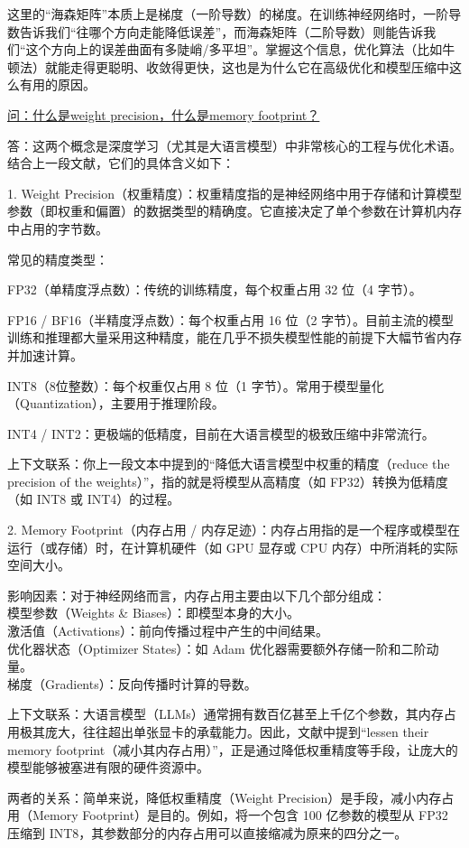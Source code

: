 \documentclass{article}
\begin{document}
{\color{blue}
这里的“海森矩阵”本质上是梯度（一阶导数）的梯度。在训练神经网络时，一阶导数告诉我们“往哪个方向走能降低误差”，而海森矩阵（二阶导数）则能告诉我们“这个方向上的误差曲面有多陡峭/多平坦”。掌握这个信息，优化算法（比如牛顿法）就能走得更聪明、收敛得更快，这也是为什么它在高级优化和模型压缩中这么有用的原因。

\underline{问：什么是weight precision，什么是memory footprint？}

答：这两个概念是深度学习（尤其是大语言模型）中非常核心的工程与优化术语。结合上一段文献，它们的具体含义如下：

1. Weight Precision（权重精度）：权重精度指的是神经网络中用于存储和计算模型参数（即权重和偏置）的数据类型的精确度。它直接决定了单个参数在计算机内存中占用的字节数。

常见的精度类型：

FP32（单精度浮点数）：传统的训练精度，每个权重占用 32 位（4 字节）。

FP16 / BF16（半精度浮点数）：每个权重占用 16 位（2 字节）。目前主流的模型训练和推理都大量采用这种精度，能在几乎不损失模型性能的前提下大幅节省内存并加速计算。

INT8（8位整数）：每个权重仅占用 8 位（1 字节）。常用于模型量化（Quantization），主要用于推理阶段。

INT4 / INT2：更极端的低精度，目前在大语言模型的极致压缩中非常流行。

上下文联系：你上一段文本中提到的“降低大语言模型中权重的精度（reduce the precision of the weights）”，指的就是将模型从高精度（如 FP32）转换为低精度（如 INT8 或 INT4）的过程。

2. Memory Footprint（内存占用 / 内存足迹）：内存占用指的是一个程序或模型在运行（或存储）时，在计算机硬件（如 GPU 显存或 CPU 内存）中所消耗的实际空间大小。

影响因素：对于神经网络而言，内存占用主要由以下几个部分组成：\\
模型参数（Weights \& Biases）：即模型本身的大小。\\
激活值（Activations）：前向传播过程中产生的中间结果。\\
优化器状态（Optimizer States）：如 Adam 优化器需要额外存储一阶和二阶动量。\\
梯度（Gradients）：反向传播时计算的导数。

上下文联系：大语言模型（LLMs）通常拥有数百亿甚至上千亿个参数，其内存占用极其庞大，往往超出单张显卡的承载能力。因此，文献中提到“lessen their memory footprint（减小其内存占用）”，正是通过降低权重精度等手段，让庞大的模型能够被塞进有限的硬件资源中。

两者的关系：简单来说，降低权重精度（Weight Precision）是手段，减小内存占用（Memory Footprint）是目的。例如，将一个包含 100 亿参数的模型从 FP32 压缩到 INT8，其参数部分的内存占用可以直接缩减为原来的四分之一。

}
\end{document}
